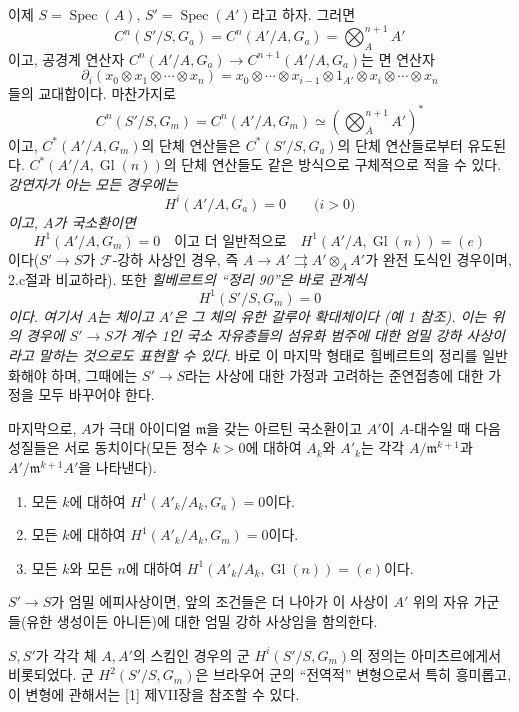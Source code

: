 이제 $S=\operatorname{Spec}(A)$,
$S'=\operatorname{Spec}(A')$라고 하자. 그러면
\[
  C^n(S'/S,G_a)=C^n(A'/A,G_a)=\bigotimes_A^{n+1}A'
\]
이고, 공경계 연산자
$C^n(A'/A,G_a)\longrightarrow C^{n+1}(A'/A,G_a)$는 면 연산자
\[
  \partial_i(x_0\otimes x_1\otimes\cdots\otimes x_n)
  =x_0\otimes\cdots\otimes x_{i-1}\otimes1_{A'}\otimes
   x_i\otimes\cdots\otimes x_n
\]
들의 교대합이다. 마찬가지로
\[
  C^n(S'/S,G_m)=C^n(A'/A,G_m)
  \simeq\left(\bigotimes_A^{n+1}A'\right)^*
\]
이고, $C^*(A'/A,G_m)$의 단체 연산들은
$C^*(S'/S,G_a)$의 단체 연산들로부터 유도된다.
$C^*(A'/A,\operatorname{Gl}(n))$의 단체 연산들도 같은 방식으로
구체적으로 적을 수 있다. \emph{강연자가 아는 모든 경우에는}
\[
  H^i(A'/A,G_a)=0\qquad\text{($i>0$)}
\]
\emph{이고, $A$가 국소환이면}
\[
  H^1(A'/A,G_m)=0
  \quad\text{이고 더 일반적으로}\quad
  H^1(A'/A,\operatorname{Gl}(n))=(e)
\]
이다($S'\longrightarrow S$가 $\mathcal F$-강하 사상인 경우, 즉
$A\longrightarrow A'\rightrightarrows A'\otimes_AA'$가 완전 도식인
경우이며, 2.c절과 비교하라). 또한 \emph{힐베르트의 “정리 90”은 바로
관계식}
\[
  H^1(S'/S,G_m)=0
\]
\emph{이다. 여기서 $A$는 체이고 $A'$은 그 체의 유한 갈루아 확대체이다
(예 1 참조). 이는 위의 경우에 $S'\longrightarrow S$가 계수 1인
국소 자유층들의 섬유화 범주에 대한 엄밀 강하 사상이라고 말하는 것으로도
표현할 수 있다.} 바로 이 마지막 형태로 힐베르트의 정리를 일반화해야 하며,
그때에는 $S'\longrightarrow S$라는 사상에 대한 가정과 고려하는
준연접층에 대한 가정을 모두 바꾸어야 한다.

마지막으로, $A$가 극대 아이디얼 $\mathfrak m$을 갖는 아르틴 국소환이고
$A'$이 $A$-대수일 때 다음 성질들은 서로 동치이다(모든 정수 $k>0$에
대하여 $A_k$와 $A'_k$는 각각
$A/\mathfrak m^{k+1}$과 $A'/\mathfrak m^{k+1}A'$을 나타낸다).
\begin{enumerate}
\item[(i)] 모든 $k$에 대하여 $H^1(A'_k/A_k,G_a)=0$이다.
\item[(ii)] 모든 $k$에 대하여 $H^1(A'_k/A_k,G_m)=0$이다.
\item[(iii)] 모든 $k$와 모든 $n$에 대하여
$H^1(A'_k/A_k,\operatorname{Gl}(n))=(e)$이다.
\end{enumerate}
$S'\longrightarrow S$가 엄밀 에피사상이면, 앞의 조건들은 더 나아가 이
사상이 $A'$ 위의 자유 가군들(유한 생성이든 아니든)에 대한 엄밀 강하
사상임을 함의한다.

 $S,S'$가 각각 체 $A,A'$의 스킴인 경우의 군
$H^i(S'/S,G_m)$의 정의는 아미츠르에게서 비롯되었다. 군
$H^2(S'/S,G_m)$은 브라우어 군의 “전역적” 변형으로서 특히 흥미롭고,
이 변형에 관해서는 [1] 제VII장을 참조할 수 있다.


